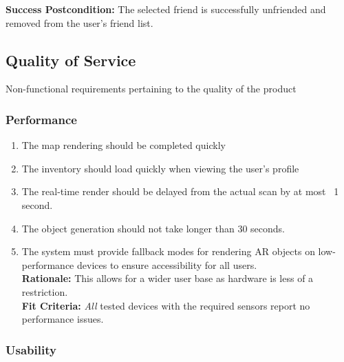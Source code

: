 \documentclass{article}
\begin{document}
\begin{enumerate}[label=\textbf{UC\arabic*}]
          \textbf{Success Postcondition:} The selected friend is successfully unfriended and removed from the user's friend list.

\end{enumerate}

\subsection{Quality of Service}

Non-functional requirements pertaining to the quality of the product


\subsubsection{Performance}
\label{sub:performance}

\begin{enumerate}[align=left, label=\textbf{QS-P\arabic*.}]
    \item The map rendering should be completed quickly
    \item The inventory should load quickly when viewing the user’s profile
    \item The real-time render should be delayed from the actual scan by at most ~1 second.
    \item The object generation should not take longer than 30 seconds.
    \item The system must provide fallback modes for rendering AR objects on low-performance devices to ensure accessibility for all users. \\
          {\bf Rationale:} This allows for a wider user base as hardware is less of a restriction. \\
          {\bf Fit Criteria:} \textit{All} tested devices with the required sensors report no performance issues.

\end{enumerate}

\subsubsection{Usability}
\label{sub:usability}
\end{document}
